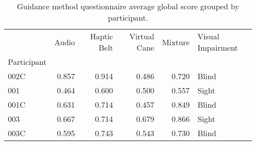 
\begin{table}[!htb]
\centering
\caption{Guidance method questionnaire average global score grouped by participant.}
\label{tab:questionnaire_average}
\begin{tabular}{lrrrrl}
\toprule
{} &  Audio &  Haptic Belt &  Virtual Cane &  Mixture & Visual Impairment \\
Participant &        &              &               &          &                   \\
\midrule
002C        &  0.857 &        0.914 &         0.486 &    0.720 &             Blind \\
001         &  0.464 &        0.600 &         0.500 &    0.557 &             Sight \\
001C        &  0.631 &        0.714 &         0.457 &    0.849 &             Blind \\
003         &  0.667 &        0.714 &         0.679 &    0.866 &             Sight \\
003C        &  0.595 &        0.743 &         0.543 &    0.730 &             Blind \\
\bottomrule
\end{tabular}
\end{table}

